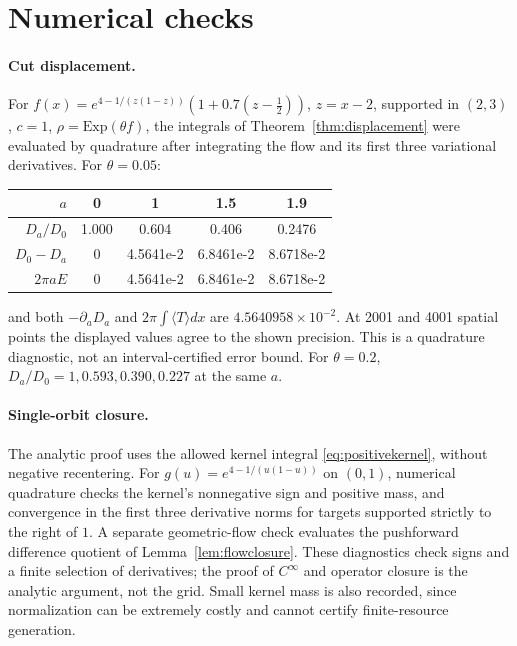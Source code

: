\documentclass[12pt]{article}
\theoremstyle{definition}
\theoremstyle{remark}
\begin{document}
\section{Numerical checks}\label{app:num}

\paragraph{Cut displacement.} For \(f(x)=e^{4-1/(z(1-z))}(1+0.7(z-\tfrac12))\), \(z=x-2\), supported in
\((2,3)\), \(c=1\), \(\rho=\mathrm{Exp}(\theta f)\), the integrals of Theorem~\ref{thm:displacement}
were evaluated by quadrature after integrating the flow and its first three
variational derivatives. For \(\theta=0.05\):
\begin{center}
\begin{tabular}{r|cccc}
\(a\) & 0 & 1 & 1.5 & 1.9\\\hline
\(D_a/D_0\) & 1.000 & 0.604 & 0.406 & 0.2476\\
\(D_0-D_a\) & 0 & 4.5641e-2 & 6.8461e-2 & 8.6718e-2\\
\(2\pi aE\) & 0 & 4.5641e-2 & 6.8461e-2 & 8.6718e-2
\end{tabular}
\end{center}
and both \(-\partial_aD_a\) and \(2\pi\int\langle T\rangle dx\) are
\(4.5640958\times10^{-2}\). At 2001 and 4001 spatial points the displayed
values agree to the shown precision. This is a quadrature diagnostic, not an
interval-certified error bound.
For \(\theta=0.2\), \(D_a/D_0=1,0.593,0.390,0.227\) at the same \(a\).

\paragraph{Single-orbit closure.} The analytic proof uses the allowed
kernel integral \eqref{eq:positivekernel}, without negative recentering.
For \(g(u)=e^{4-1/(u(1-u))}\) on \((0,1)\), numerical quadrature checks
the kernel's nonnegative sign and positive mass, and convergence in the first
three derivative norms for targets supported strictly to the right of \(1\).
A separate geometric-flow check evaluates the pushforward difference quotient
of Lemma~\ref{lem:flowclosure}. These diagnostics check signs and a finite
selection of derivatives; the proof of \(C^\infty\) and operator closure is
the analytic argument, not the grid. Small kernel mass is also recorded,
since normalization can be extremely costly and cannot certify finite-resource
generation.
\end{document}
